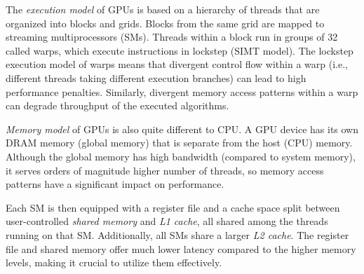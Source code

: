 The \emph{execution model} of GPUs is based on a hierarchy of threads that are organized into blocks and grids. Blocks from the same grid are mapped to streaming multiprocessors (SMs). Threads within a block run in groups of 32 called warps, which execute instructions in lockstep (SIMT model).
The lockstep execution model of warps means that divergent control flow within a warp (i.e., different threads taking different execution branches) can lead to high performance penalties. Similarly, divergent memory access patterns within a warp can degrade throughput of the executed algorithms.

\emph{Memory model} of GPUs is also quite different to CPU\@. A GPU device has its own DRAM memory (global memory) that is separate from the host (CPU) memory. Although the global memory has high bandwidth (compared to system memory), it serves orders of magnitude higher number of threads, so memory access patterns have a significant impact on performance.

Each SM is then equipped with a register file and a cache space split between user-controlled \emph{shared memory} and \emph{L1 cache}, all shared among the threads running on that SM\@. Additionally, all SMs share a larger \emph{L2 cache}. The register file and shared memory offer much lower latency compared to the higher memory levels, making it crucial to utilize them effectively.

